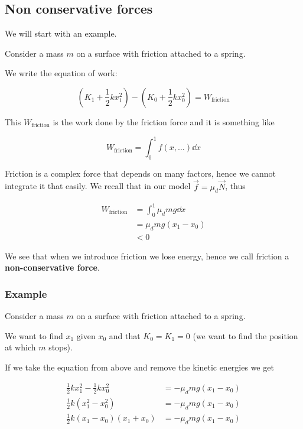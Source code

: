 \documentclass[10pt]{extarticle}
\begin{document}
\subsection{Non conservative forces}

We will start with an example.

Consider a mass $m$ on a surface with friction attached to a spring.

We write the equation of work:

$$
  (K_1 + \frac{1}{2}kx_1^2) - (K_0 + \frac{1}{2}kx_0^2) = W_{\text{friction}}
$$

This $W_{\text{friction}}$ is the work done by the friction force and it is something like

$$
  W_{\text{friction}} = \int_0^1 f(x, \ldots) \dd{x}
$$

Friction is a complex force that depends on many factors, hence we cannot integrate it that easily. We recall that in our model $\vec f = \mu_d \vec N$, thus

\begin{align*}
  W_{\text{friction}} & = \int_0^1 \mu_d mg \dd{x} \\
                      & = \mu_d mg (x_1 - x_0)     \\
                      & < 0
\end{align*}

We see that when we introduce friction we lose energy, hence we call friction a \textbf{non-conservative force}.

\subsubsection{Example}

Consider a mass $m$ on a surface with friction attached to a spring.

We want to find $x_1$ given $x_0$ and that $K_0 = K_1 = 0$ (we want to find the position at which $m$ stops).

If we take the equation from above and remove the kinetic energies we get

\begin{align*}
  \frac{1}{2} k x_1^2 - \frac{1}{2} k x_0^2 & = - \mu_d m g (x_1 - x_0) \\
  \frac{1}{2} k (x_1^2 - x_0^2)             & = - \mu_d m g (x_1 - x_0) \\
  \frac{1}{2} k (x_1 - x_0)(x_1 + x_0)      & = - \mu_d m g (x_1 - x_0) \\
\end{align*}
\end{document}
